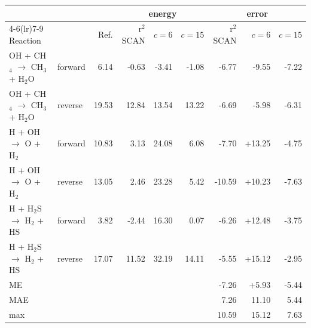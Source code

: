 \begin{tabular}{@{}ll rrrr rrr@{}}
\toprule
 &  &  & \multicolumn{3}{c}{energy} & \multicolumn{3}{c}{error} \\
\cmidrule(lr){4-6}\cmidrule(lr){7-9}
Reaction &  & Ref. & r$^2$SCAN & $c=6$ & $c=15$ & r$^2$SCAN & $c=6$ & $c=15$ \\
\midrule
OH + CH$_4$ $\to$ CH$_3$ + H$_2$O & forward & 6.14 & \textcolor{pyscfred}{-0.63} & \textcolor{pyscfred}{-3.41} & \textcolor{pyscfred}{-1.08} & \textcolor{pyscfred}{-6.77} & \textcolor{pyscfred}{-9.55} & \textcolor{pyscfred}{-7.22} \\
OH + CH$_4$ $\to$ CH$_3$ + H$_2$O & reverse & 19.53 & \textcolor{pyscfred}{12.84} & \textcolor{pyscfred}{13.54} & \textcolor{pyscfred}{13.22} & \textcolor{pyscfred}{-6.69} & \textcolor{pyscfred}{-5.98} & \textcolor{pyscfred}{-6.31} \\
H + OH $\to$ O + H$_2$ & forward & 10.83 & \textcolor{pyscfred}{3.13} & \textcolor{pyscfred}{24.08} & \textcolor{pyscfred}{6.08} & \textcolor{pyscfred}{-7.70} & \textcolor{pyscfred}{+13.25} & \textcolor{pyscfred}{-4.75} \\
H + OH $\to$ O + H$_2$ & reverse & 13.05 & \textcolor{pyscfred}{2.46} & \textcolor{pyscfred}{23.28} & \textcolor{pyscfred}{5.42} & \textcolor{pyscfred}{-10.59} & \textcolor{pyscfred}{+10.23} & \textcolor{pyscfred}{-7.63} \\
H + H$_2$S $\to$ H$_2$ + HS & forward & 3.82 & \textcolor{pyscfred}{-2.44} & \textcolor{pyscfred}{16.30} & \textcolor{pyscfred}{0.07} & \textcolor{pyscfred}{-6.26} & \textcolor{pyscfred}{+12.48} & \textcolor{pyscfred}{-3.75} \\
H + H$_2$S $\to$ H$_2$ + HS & reverse & 17.07 & \textcolor{pyscfred}{11.52} & \textcolor{pyscfred}{32.19} & \textcolor{pyscfred}{14.11} & \textcolor{pyscfred}{-5.55} & \textcolor{pyscfred}{+15.12} & \textcolor{pyscfred}{-2.95} \\
\midrule
ME &  &  &  &  &  & \textcolor{pyscfred}{-7.26} & \textcolor{pyscfred}{+5.93} & \textcolor{pyscfred}{-5.44} \\
MAE &  &  &  &  &  & \textcolor{pyscfred}{7.26} & \textcolor{pyscfred}{11.10} & \textcolor{pyscfred}{5.44} \\
max &  &  &  &  &  & \textcolor{pyscfred}{10.59} & \textcolor{pyscfred}{15.12} & \textcolor{pyscfred}{7.63} \\
\bottomrule
\end{tabular}
